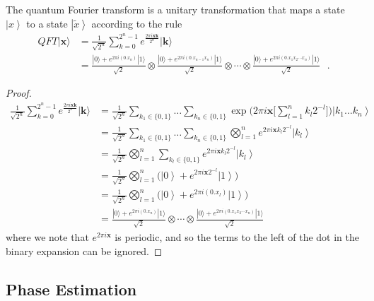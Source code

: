 \documentclass{article}
\newcommand{\ket}[1]{\ensuremath{\left|#1\right\rangle}}
\begin{document}
    \begin{theorem}
      The quantum Fourier transform is a unitary transformation that maps a state $\ket{x}$ to a state $\ket{\tilde{x}}$ according to the rule 
      \begin{align}
      QFT|\mathbf{x}\rangle &= 
      \frac{1}{\sqrt{2^n}} \sum_{k = 0}^{2^n-1} e^{\frac{2 \pi i \mathbf{x} \mathbf{k} }{2^n}} |\mathbf{k}\rangle \\ & = \frac{|0 \rangle + e^{2\pi i (0.x_n)}|1\rangle}{\sqrt{2}} \otimes \frac{|0\rangle + e^{2 \pi i (0.x_{n-1}x_n)}|1\rangle}{\sqrt{2}} \otimes \cdots \otimes \frac{|0\rangle + e^{2 \pi i (0.x_1 x_2\cdots x_n)}|1\rangle}{\sqrt{2}} \ \ \ .
      \end{align}
    \end{theorem}
    \begin{proof} 
      \begin{align} 
        \frac{1}{\sqrt{2^n}} \sum_{k = 0}^{2^n-1} e^{\frac{2 \pi i \mathbf{x} \mathbf{k} }{2^n}} |\mathbf{k}\rangle 
        & = \frac{1}{\sqrt{2^n}} \sum_{k_1 \in \{0, 1\}} \ldots \sum_{k_n \in \{0, 1\}} \exp \bigg( 2 \pi i \mathbf{x} \Big[ \sum_{l=1}^n k_l 2^{-l} \Big]\bigg) \ket{k_1 \ldots k_n} \\
        & = \frac{1}{\sqrt{2^n}} \sum_{k_1 \in \{0, 1\}} \ldots \sum_{k_n \in \{0, 1\}} \bigotimes_{l=1}^n e^{2 \pi i \mathbf{x} k_l 2^{-l}} \ket{k_l} \\
        & = \frac{1}{\sqrt{2^n}} \bigotimes_{l=1}^n \sum_{k_l \in \{0, 1\}} e^{2 \pi i \mathbf{x} k_l 2^{-l}} \ket{k_l} \\
        & = \frac{1}{\sqrt{2^n}} \bigotimes_{l=1}^n \bigg( \ket{0} + e^{2 \pi i \mathbf{x} 2^{-l}} \ket{1} \bigg) \\ 
        & = \frac{1}{\sqrt{2^n}} \bigotimes_{l=1}^n \bigg( \ket{0} + e^{2 \pi i (0.x_l)} \ket{1} \bigg) \\ 
        & = \frac{|0 \rangle + e^{2\pi i (0.x_n)}|1\rangle}{\sqrt{2}} \otimes \cdots \otimes \frac{|0\rangle + e^{2 \pi i (0.x_1 x_2\cdots x_n)}|1\rangle}{\sqrt{2}} 
      \end{align}
      where we note that $e^{2 \pi i \mathbf{x}}$ is periodic, and so the terms to the left of the dot in the binary expansion can be ignored. 
    \end{proof}

  \subsection{Phase Estimation}
\end{document}
